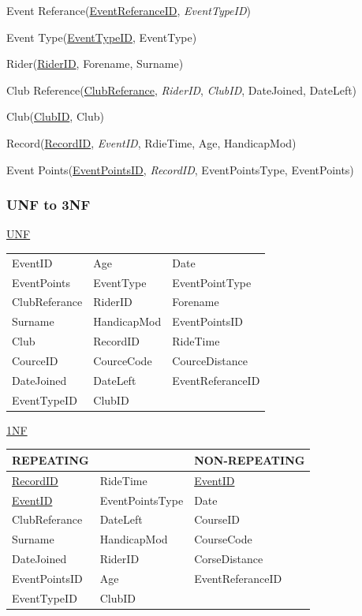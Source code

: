 Event Referance(\underline{EventReferanceID}, \emph{EventTypeID})

Event Type(\underline{EventTypeID}, EventType)

Rider(\underline{RiderID}, Forename, Surname)

Club Reference(\underline{ClubReferance}, \emph{RiderID}, \emph{ClubID}, DateJoined, DateLeft)

Club(\underline{ClubID}, Club)

Record(\underline{RecordID}, \emph{EventID}, RdieTime, Age, HandicapMod)

Event Points(\underline{EventPointsID}, \emph{RecordID}, EventPointsType, EventPoints)

\subsubsection{UNF to 3NF}
\underline{UNF}


\begin{tabular}{l l l}
EventID        & Age              & Date               \\
EventPoints    & EventType        & EventPointType     \\
ClubReferance  & RiderID          & Forename           \\
Surname        & HandicapMod      & EventPointsID      \\
Club           & RecordID         & RideTime           \\
CourceID       & CourceCode       & CourceDistance     \\
DateJoined     & DateLeft         & EventReferanceID   \\
EventTypeID    & ClubID           &                    \\

\end{tabular}

\underline{1NF}

\begin{tabular}{|l l|l|}
\hline
REPEATING           &                 & NON-REPEATING       \\ \hline
\underline{RecordID}& RideTime        & \underline{EventID} \\ \hline
\underline{EventID} & EventPointsType & Date                \\ \hline
ClubReferance       & DateLeft        & CourseID            \\ \hline
Surname             & HandicapMod     & CourseCode          \\ \hline
DateJoined          & RiderID         & CorseDistance       \\ \hline 
EventPointsID       & Age             & EventReferanceID    \\ \hline
EventTypeID         & ClubID          &                     \\ \hline
\end{tabular}




